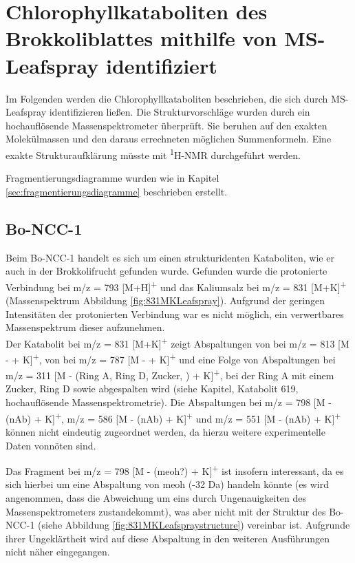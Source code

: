 \section{Chlorophyllkataboliten des Brokkoliblattes mithilfe von MS-Leafspray identifiziert}

Im Folgenden werden die Chlorophyllkataboliten beschrieben, die sich durch MS-Leafspray identifizieren ließen. Die Strukturvorschläge wurden durch ein hochauflösende Massenspektrometer überprüft. Sie beruhen auf den exakten Molekülmassen und den daraus errechneten möglichen Summenformeln. Eine exakte Strukturaufklärung müsste mit \textsuperscript{1}H-NMR durchgeführt werden. 

Fragmentierungsdiagramme wurden wie in Kapitel \ref{sec:fragmentierungsdiagramme} beschrieben erstellt.

\subsection{Bo-NCC-1}

Beim Bo-NCC-1 handelt es sich um einen strukturidenten Kataboliten, wie er auch in der Brokkolifrucht gefunden wurde. \cite{ChlorophyllCatabolitesBroccoli} Gefunden wurde die protonierte Verbindung bei m/z = 793 [M+H]\textsuperscript{+} und das Kaliumsalz bei m/z = 831 [M+K]\textsuperscript{+} (Massenspektrum Abbildung \ref{fig:831MKLeafspray}). Aufgrund der geringen Intensitäten der protonierten Verbindung war es nicht möglich, ein verwertbares Massenspektrum dieser aufzunehmen. \\

Der Katabolit bei m/z = 831 [M+K]\textsuperscript{+} zeigt Abspaltungen von  bei m/z = 813 [M -  + K]\textsuperscript{+}, von  bei m/z = 787 [M -  + K]\textsuperscript{+} und eine Folge von Abspaltungen bei m/z = 311 [M - (Ring A, Ring D, Zucker, ) + K]\textsuperscript{+}, bei der Ring A mit einem Zucker, Ring D sowie  abgespalten wird (siehe Kapitel, Katabolit 619, hochauflösende Massenspektrometrie). Die Abspaltungen bei m/z = 798 [M - (\gls{nAb}) + K]\textsuperscript{+}, m/z = 586 [M - (\gls{nAb}) + K]\textsuperscript{+} und m/z = 551 [M - (\gls{nAb}) + K]\textsuperscript{+} können nicht eindeutig zugeordnet werden, da hierzu weitere experimentelle Daten vonnöten sind. 

Das Fragment bei m/z = 798 [M - (\gls{meoh}?) + K]\textsuperscript{+} ist insofern interessant, da es sich hierbei um eine Abspaltung von \gls{meoh} (-32 Da) handeln könnte (es wird angenommen, dass die Abweichung um eins durch Ungenauigkeiten des Massenspektrometers zustandekommt), was aber nicht mit der Struktur des Bo-NCC-1 (siehe Abbildung \ref{fig:831MKLeafspraystructure}) vereinbar ist. Aufgrunde ihrer Ungeklärtheit wird auf diese Abspaltung in den weiteren Ausführungen nicht näher eingegangen.

